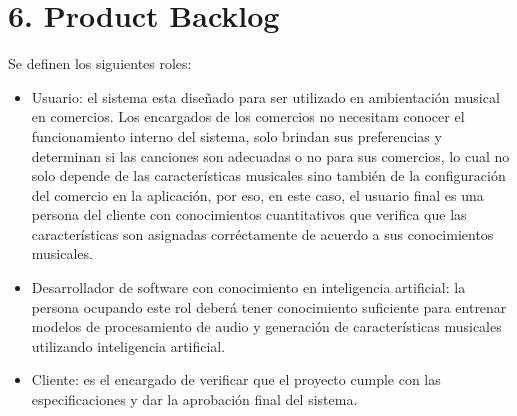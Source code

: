 \documentclass[
11pt, %
]{charter}
\begin{document}

\section{6. Product Backlog}
\label{sec:backlog}








Se definen los siguientes roles:

\begin{itemize}
	\item Usuario: el sistema esta diseñado para ser utilizado en ambientación musical en comercios. Los encargados de los comercios no necesitam conocer el funcionamiento interno del sistema, solo brindan sus preferencias y determinan si las canciones son adecuadas o no para sus comercios, lo cual no solo depende de las características musicales sino también de la configuración del comercio en la aplicación, por eso, en este caso, el usuario final es una persona del cliente con conocimientos cuantitativos que verifica que las características son asignadas corréctamente de acuerdo a sus conocimientos musicales.
	\item Desarrollador de software con conocimiento en inteligencia artificial: la persona ocupando este rol deberá tener conocimiento suficiente para entrenar modelos de procesamiento de audio y generación de características musicales utilizando inteligencia artificial.
	\item Cliente: es el encargado de verificar que el proyecto cumple con las especificaciones y dar la aprobación final del sistema.
\end{itemize}
\end{document}
